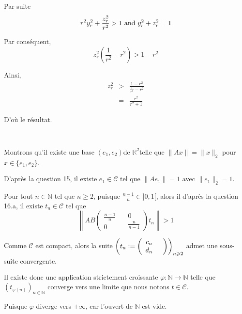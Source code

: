 Par suite
\[ r^2 y_r^2 + \frac{z_r^2}{r^2} > 1 \text{ and } y_r^2 + z^2_r = 1 \]


Par cons{\'e}quent,
\[ z^2_r \left( \frac{1}{r^2} - r^2 \right) > 1 - r^2 \]


Ainsi,
\begin{eqnarray*}
  z^2_r & > & \frac{1 - r^2}{\frac{1}{r^2} - r^2}\\
  & = & \frac{r^2}{r^2 + 1}
\end{eqnarray*}


D'o{\`u} le r{\'e}sultat.

\

 Montrons qu'il existe une base $(e_1, e_2) $de $\mathbb{R}^2
$telle que $\| A x \| = \| x \|_2$ pour $x \in \{ e_1, e_2 \}$.

D'apr{\`e}s la question 15, il existe $e_1 \in \mathcal{C}$ tel que $\| A e_1
\| = 1$ avec $\| e_1 \|_2 = 1$.

Pour tout $n \in \mathbb{N} $ tel que $n \geqslant 2$, puisque $\frac{n -
1}{n} \in] 0, 1 [$, alors il d'apr{\`e}s la question 16.a, il existe $t_n \in
\mathcal{C}$ tel que
\[ \left\| A B \left( \begin{array}{c}
     \frac{n - 1}{n}\\
     0
   \end{array} \quad \begin{array}{c}
     0\\
     \frac{n}{n - 1}
   \end{array} \right) \text{} t_n \right\| > 1 \]


Comme $\mathcal{C}$ est compact, alors la suite $\left( t_n \assign \left(
\begin{array}{c}
  c_n\\
  d_n
\end{array} \begin{array}{c}
  \\
  
\end{array} \right) \right)_{n \geqslant 2}$ admet une sous-suite convergente.

Il existe donc une application strictement croissante $\varphi : \mathbb{N}
\rightarrow \mathbb{N}$ telle que $(t_{\varphi (n)})_{n \in \mathbb{N}}$
converge vers une limite que nous notons $t \in \mathcal{C}$.

Puisque $\varphi$ diverge vers $+ \infty$, car l'ouvert de $\mathbb{N}$ est
vide.

